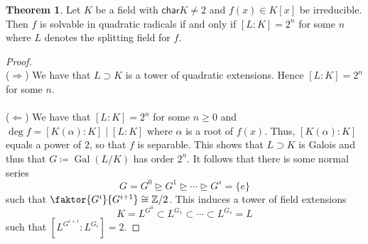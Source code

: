 \documentclass[10pt,letterpaper,cm]{nupset}
\theoremstyle{definition}
\newtheorem{theorem}{Theorem}
\newcommand{\Z}{\mathbb Z}
\newcommand{\1}{\mathbf{1}}
\newcommand{\0}{\vec 0}
\newcommand{\Char}{\mathsf{char}}
\DeclareMathOperator{\gal}{Gal}
\begin{document}
\begin{theorem}
Let $K$ be a field with $\Char{K} \ne 2$ and $f(x) \in K[x]$ be irreducible. Then $f$ is solvable in quadratic radicals if and only if $[L:K] =2^n$ for some $n$ where $L$ denotes the splitting field for $f$.
\end{theorem}
\begin{proof} $ $
\\
($\Longrightarrow$) We have that $L \supset K$ is a tower of quadratic extensions. Hence  $[L:K] = 2^n$ for some $n$. 
\\ \\
($\Longleftarrow$)  We have that $[L:K] = 2^n$ for some $n\geq 0$ and $\deg{f} = [K(\alpha): K] \mid [L: K]$ where $\alpha$ is a root of $f(x)$. Thus, $[K(\alpha): K]$ equals a power of $2$, so that $f$ is separable. This shows that $L \supset K$ is Galois and thus that $G\coloneqq  \gal(L/K)$ has order $2^n$. It follows that there is some normal series $$ G =G^0 \unrhd G^1  \unrhd \cdots \unrhd G^s = \{e\}  $$ such that $\faktor{G^{i}}{G^{i+1}} \cong \Z/2$. This induces a tower of field  extensions $$ K= L^{G^0} \subset L^{G_1} \subset \cdots \subset L^{G_s} = L   $$ such that $[L^{G^{i+1}}: L^{G_i}] =2$.
\end{proof}
\end{document}
